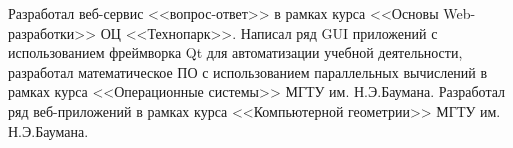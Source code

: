 \documentclass[a4paper, 10pt]{extarticle}
\begin{document}
    \noindent Разработал веб-сервис <<вопрос-ответ>> в рамках курса <<Основы Web-разработки>>
    ОЦ <<Технопарк>>. Написал ряд GUI приложений с использованием фреймворка Qt для автоматизации учебной
    деятельности, разработал математическое ПО с использованием параллельных вычислений в рамках курса <<Операционные системы>>
    МГТУ им. Н.Э.Баумана. Разработал ряд веб-приложений в рамках курса <<Компьютерной геометрии>> МГТУ им. Н.Э.Баумана.
\end{document}
